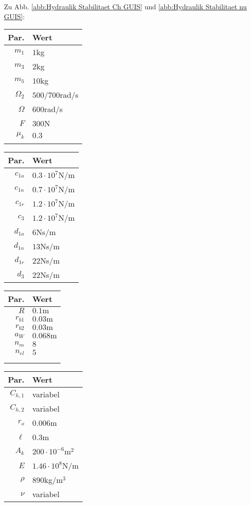 Zu Abb. \ref{abb:Hydraulik Stabilitaet Ch GUIS} und \ref{abb:Hydraulik Stabilitaet nu GUIS}:
\begin{center}
\begin{tabular}{r|l}
Par. &Wert\\\hline
$m_1$&$1$kg\\
$m_3$& $2$kg\\
$m_5$&$10$kg\\
$\Omega_2$&$500$/$700$rad/s\\
$\Omega$&$600$rad/s\\
$F$&$300$N\\
$\mu_k$& $0.3$\\
&\\
\end{tabular} \hfill
\begin{tabular}{r|l}
Par. &Wert\\\hline
$c_{1a}$&$0.3\cdot10^{7}$N/m\\
$c_{1n}$&$0.7\cdot10^{7}$N/m \\
$c_{1r}$ & $1.2\cdot10^{7}$N/m\\
$c_{3}$& $1.2\cdot10^{7}$N/m\\
$d_{1a}$&$6$Ns/m\\
$d_{1n}$&$13$Ns/m \\
$d_{1r}$ &$22$Ns/m\\
$d_{3}$ & $22$Ns/m\\
\end{tabular}\hfill
\begin{tabular}{r|l}
Par. &Wert\\\hline
$R$&$0.1\textrm{m}$ \\
$r_{b1}$&$0.03\textrm{m}$\\
$r_{b2}$&$0.03\textrm{m}$\\
$a_{W}$&$ 0.068\textrm{m}$\\
$n_m$&$8$\\
$n_{el}$&$5$\\
&\\
&
\end{tabular} \hfill
\begin{tabular}{r|l}
Par. &Wert\\\hline
$C_{h,1}$&variabel\\
$C_{h,2}$&variabel\\
$r_o$&$0.006$m\\
$\ell$&$0.3$m\\
$A_k$&$200\cdot10^{-6}$m$^2$\\
$E$&$1.46\cdot10^{8}$N/m\\
$\rho$&$890$kg/m$^3$\\
$\nu$&variabel\\
\end{tabular}
\end{center}

